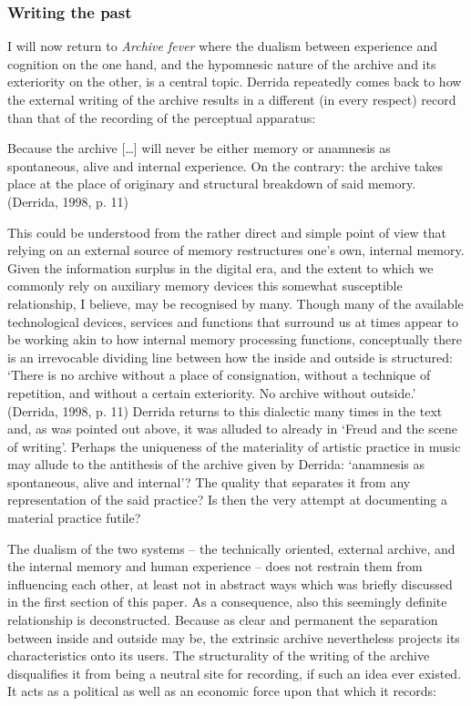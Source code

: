 \hypertarget{writing-the-past}{%
\subsubsection{Writing the past}\label{writing-the-past}}

I will now return to \emph{Archive fever} where the dualism between
experience and cognition on the one hand, and the hypomnesic nature of
the archive and its exteriority on the other, is a central topic.
Derrida repeatedly comes back to how the external writing of the archive
results in a different (in every respect) record than that of the
recording of the perceptual apparatus:

Because the archive {[}\ldots{}{]} will never be either memory or
anamnesis as spontaneous, alive and internal experience. On the
contrary: the archive takes place at the place of originary and
structural breakdown of said memory. (Derrida, 1998, p. 11)

This could be understood from the rather direct and simple point of view
that relying on an external source of memory restructures one's own,
internal memory. Given the information surplus in the digital era, and
the extent to which we commonly rely on auxiliary memory devices this
somewhat susceptible relationship, I believe, may be recognised by many.
Though many of the available technological devices, services and
functions that surround us at times appear to be working akin to how
internal memory processing functions, conceptually there is an
irrevocable dividing line between how the inside and outside is
structured: `There is no archive without a place of consignation,
without a technique of repetition, and without a certain exteriority. No
archive without outside.' (Derrida, 1998, p. 11) Derrida returns to this
dialectic many times in the text and, as was pointed out above, it was
alluded to already in `Freud and the scene of writing'. Perhaps the
uniqueness of the materiality of artistic practice in music may allude
to the antithesis of the archive given by Derrida: `anamnesis as
spontaneous, alive and internal'? The quality that separates it from any
representation of the said practice? Is then the very attempt at
documenting a material practice futile?

The dualism of the two systems -- the technically oriented, external
archive, and the internal memory and human experience -- does not
restrain them from influencing each other, at least not in abstract ways
which was briefly discussed in the first section of this paper. As a
consequence, also this seemingly definite relationship is deconstructed.
Because as clear and permanent the separation between inside and outside
may be, the extrinsic archive nevertheless projects its characteristics
onto its users. The structurality of the writing of the archive
disqualifies it from being a neutral site for recording, if such an idea
ever existed. It acts as a political as well as an economic force upon
that which it records:

